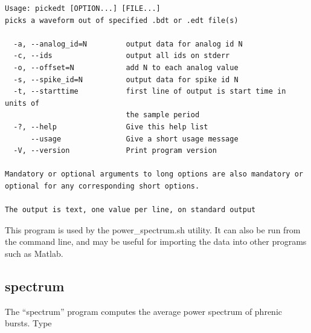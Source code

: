 \documentclass[12pt,openany,oneside]{book}
\newcommand{\inquotes}[1]{{{``#1''}}}
\newenvironment{ticartouche}{\begin{lrbox}{\savepar}
\begin{minipage}{.98\hsize}}
{\end{minipage}\end{lrbox}\noindent\fbox{\usebox{\savepar}}}
\begin{document}
\begin{ticartouche}
\begin{verbatim}
Usage: pickedt [OPTION...] [FILE...]
picks a waveform out of specified .bdt or .edt file(s)

  -a, --analog_id=N         output data for analog id N
  -c, --ids                 output all ids on stderr
  -o, --offset=N            add N to each analog value
  -s, --spike_id=N          output data for spike id N
  -t, --starttime           first line of output is start time in units of
                            the sample period
  -?, --help                Give this help list
      --usage               Give a short usage message
  -V, --version             Print program version

Mandatory or optional arguments to long options are also mandatory or
optional for any corresponding short options.

The output is text, one value per line, on standard output
\end{verbatim}
\end{ticartouche}

\noindent
This program is used by the power\_spectrum.sh utility. It can also be
run from the command line, and may be useful for importing the data
into other programs such as Matlab.



\filbreak
\subsection{spectrum}

The \inquotes{spectrum} program computes the average power spectrum of
phrenic bursts. Type
\end{document}
